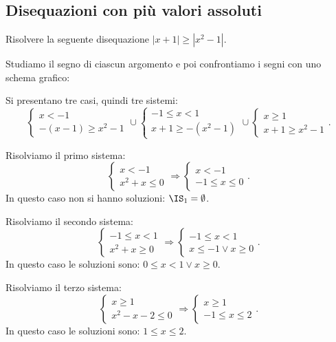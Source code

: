 \subsection{Disequazioni con più valori assoluti}
\begin{exrig}
\begin{esempio}
Risolvere la seguente disequazione $\left|x+1\right|\ge \left|x^2-1\right|$.

Studiamo il segno di ciascun argomento e poi confrontiamo i segni con uno schema grafico:
\begin{center}

\end{center}
Si presentano tre casi, quindi tre sistemi: 
\[\left\{\begin{array}{l}{x<-1}\\{-(x-1)\ge x^2-1}\end{array}\right.\cup \left\{\begin{array}{l}{-1\le x<1}\\{x+1\ge -\left(x^2-1\right)}\end{array}\right.\cup \left\{\begin{array}{l}{x\ge 1}\\{x+1\ge x^2-1}\end{array}\right..\]

Risolviamo il primo sistema: \[\left\{\begin{array}{l}x<-1\\x^2+x\le 0\end{array}\right.\Rightarrow \left\{\begin{array}{l}x<-1 \\-1\le x\le 0\end{array}\right..\] 
In questo caso non si hanno soluzioni: $\IS_1 = \emptyset$.

Risolviamo il secondo sistema: 
\[\left\{\begin{array}{l}-1\le x<1\\x^2+x\ge 0\end{array}\right.\Rightarrow \left\{\begin{array}{l}-1\le x<1 \\x\le -1\vee x\ge 0\end{array}\right..\] 
In questo caso le soluzioni sono: $0\le x<1\vee x\ge 0.$

Risolviamo il terzo sistema: \[\left\{\begin{array}{l}x\ge 1\\x^2-x-2\le 0\end{array}\right.\Rightarrow \left\{\begin{array}{l}x\ge 1 \\-1\le x\le 2\end{array}\right..\] 
In questo caso le soluzioni sono: $1\le x\le 2.$


\end{esempio}
\end{exrig}
